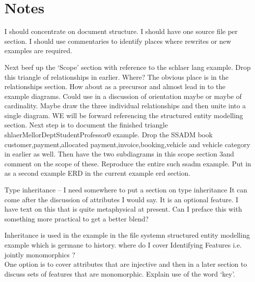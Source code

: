 \section*{Notes}
\mynote I should concentrate on document structure.
\mynote I should have one source file per section.
\mynote I should use commentaries to identify places where rewrites or new examples are required. 

\mynote Next beef up the `Scope' section with reference to the schlaer lang example.
Drop this triangle of relationships in earlier. Where? The obvious place is in the relationships section. How about as a precursor and almost lead in to the example diagrams. Could use in a discussion of orientation maybe or maybe of cardinality. Maybe draw the three individual relationships and then unite into a single diagram.
WE will be forward referencing the structured entity modelling section. Next step is to document the finished triangle shlaerMellorDeptStudentProfessor0 example.
Drop the SSADM book customer,payment,allocated payment,invoice,booking,vehicle and vehicle category in earlier as well. Then have the two subdiagrams in this scope section 3and comment on the scope of these.
Reproduce the entire such ssadm example. Put in as a second example ERD in the current example erd section.

\mynote Type inheritance -- I need somewhere to put a section on type inheritance
It can come after the discussion of attributes I would say.
It is an optional feature. I have text on this that is quite metaphysical at present.
Can I preface this with something more practical to get a better blend?

Inheritance is used in the example in the file systemn structured entity modelling example which is germane to history.
\mynote where do I cover Identifying Features i.e. jointly monomorphics ?\\
One option is to cover attributes that are injective and then in a later section to discuss sets of features that are monomorphic. Explain use of the word `key'. 

